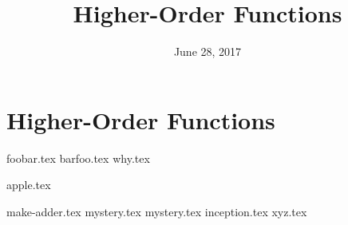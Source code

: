 \documentclass{exam}
\title{Higher-Order Functions}
\date{June 28, 2017}
\begin{document}
\maketitle

\section{Higher-Order Functions}
\begin{questions}
{foobar.tex}
{barfoo.tex}
{why.tex}
\clearpage

{apple.tex}

{make-adder.tex}
{mystery.tex}
{mystery.tex}
\clearpage
{inception.tex}
{xyz.tex}

\end{questions}
\end{document}
